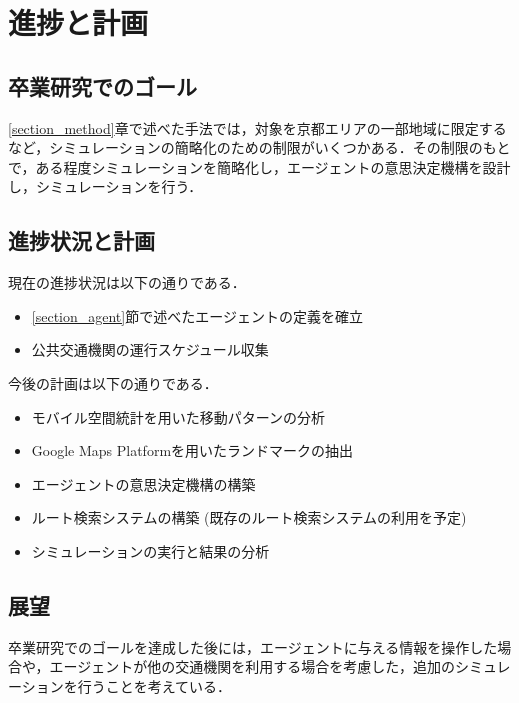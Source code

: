 \section{進捗と計画}
\subsection{卒業研究でのゴール}
\ref{section_method}章で述べた手法では，対象を京都エリアの一部地域に限定するなど，シミュレーションの簡略化のための制限がいくつかある．その制限のもとで，ある程度シミュレーションを簡略化し，エージェントの意思決定機構を設計し，シミュレーションを行う．

\subsection{進捗状況と計画}
現在の進捗状況は以下の通りである．
\begin{itemize}
  \item \ref{section_agent}節で述べたエージェントの定義を確立
  \item 公共交通機関の運行スケジュール収集
\end{itemize}

今後の計画は以下の通りである．
\begin{itemize}
  \item モバイル空間統計を用いた移動パターンの分析
  \item Google Maps Platformを用いたランドマークの抽出
  \item エージェントの意思決定機構の構築
  \item ルート検索システムの構築 (既存のルート検索システムの利用を予定)
  \item シミュレーションの実行と結果の分析
\end{itemize}

\subsection{展望}
卒業研究でのゴールを達成した後には，エージェントに与える情報を操作した場合や，エージェントが他の交通機関を利用する場合を考慮した，追加のシミュレーションを行うことを考えている．

